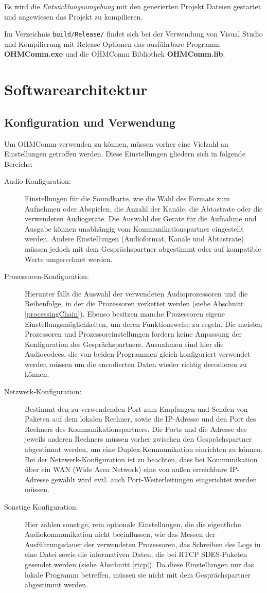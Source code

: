 Es wird die \textit{Entwicklungsumgebung} mit den generierten Projekt Dateien gestartet und angewiesen das Projekt zu kompilieren.

Im Verzeichnis \texttt{build/Release/} findet sich bei der Verwendung von Visual Studio und Kompilierung mit Release Optionen das ausführbare Programm \textbf{OHMComm.exe} und die OHMComm Bibliothek \textbf{OHMComm.lib}.

\section{Softwarearchitektur}
\subsection{Konfiguration und Verwendung}
\label{configurationUsages}
Um OHMComm verwenden zu können, müssen vorher eine Vielzahl an Einstellungen getroffen werden. Diese Einstellungen gliedern sich in folgende Bereiche:
\begin{description}
\item[Audio-Konfiguration:]Einstellungen für die Soundkarte, wie die Wahl des Formats zum Aufnehmen oder Abspielen, die Anzahl der Kanäle, die Abtastrate oder die verwendeten Audiogeräte. Die Auswahl der Geräte für die Aufnahme und Ausgabe können unabhängig vom Kommunikationspartner eingestellt werden. Andere Einstellungen (Audioformat, Kanäle und Abtastrate) müssen jedoch mit dem Gesprächspartner abgestimmt oder auf kompatible Werte umgerechnet werden.
\item[Prozessoren-Konfiguration:]Hierunter fällt die Auswahl der verwendeten Audioprozessoren und die Reihenfolge, in der die Prozessoren verkettet werden (siehe Abschnitt \ref{processingChain}). Ebenso besitzen manche Prozessoren eigene Einstellungsmöglichkeiten, um deren Funktionsweise zu regeln. Die meisten Prozessoren und Prozessoreinstellungen fordern keine Anpassung der Konfiguration des Gesprächspartners. Ausnahmen sind hier die Audiocodecs, die von beiden Programmen gleich konfiguriert verwendet werden müssen um die encodierten Daten wieder richtig decodieren zu können.
\item[Netzwerk-Konfiguration:]Bestimmt den zu verwendenden Port zum Empfangen und Senden von Paketen auf dem lokalen Rechner, sowie die IP-Adresse und den Port des Rechners des Kommunikationspartners. Die Ports und die Adresse des jeweils anderen Rechners müssen vorher zwischen den Gesprächspartner abgestimmt werden, um eine Duplex-Kommunikation einrichten zu können. Bei der Netzwerk-Konfiguration ist zu beachten, dass bei Kommunikation über ein WAN (Wide Area Network) eine von außen erreichbare IP-Adresse gewählt wird evtl. auch Port-Weiterleitungen eingerichtet werden müssen.
\item[Sonstige Konfiguration:] Hier zählen sonstige, rein optionale Einstellungen, die die eigentliche Audiokommunikation nicht beeinflussen, wie das Messen der Ausführungsdauer der verwendeten Prozessoren, das Schreiben des Logs in eine Datei sowie die informativen Daten, die bei RTCP SDES-Paketen gesendet werden (siehe Abschnitt \ref{rtcp}). Da diese Einstellungen nur das lokale Programm betreffen, müssen sie nicht mit dem Gesprächspartner abgestimmt werden.
\end{description}
